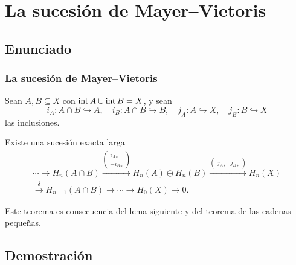 \section{La sucesión de Mayer--Vietoris}

\subsection{Enunciado}

\begin{frame}
  \frametitle{La sucesión de Mayer--Vietoris}

  Sean $A,B\subseteq X$ con $\operatorname{int} A\cup\operatorname{int} B=X$, y sean
  \[
    i_A\colon A\cap B\hookrightarrow A,\quad
    i_B\colon A\cap B\hookrightarrow B,\quad
    j_A\colon A\hookrightarrow X,\quad
    j_B\colon B\hookrightarrow X
  \]
  las inclusiones.

  \begin{theorem}
    Existe una sucesión exacta larga
    \begin{multline*}
      \cdots\to H_n(A\cap B)\xrightarrow{\left(\begin{smallmatrix}{i_A}_*\\-{i_B}_*\end{smallmatrix}\right)}H_n(A)\oplus H_n(B)
      \xrightarrow{\left(\begin{smallmatrix}{j_A}_* & {j_B}_*\end{smallmatrix}\right)}H_n(X)\\
      \xrightarrow{\ \delta\ }H_{n-1}(A\cap B)\to\cdots\to H_0(X)\to0.
    \end{multline*}
  \end{theorem}

  Este teorema es consecuencia del lema siguiente y del teorema de las
  cadenas pequeñas.
\end{frame}

\subsection{Demostración}

